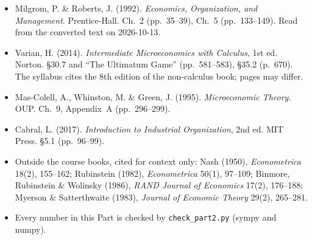 \begin{itemize}
  \item Milgrom, P. \& Roberts, J. (1992). \emph{Economics, Organization, and Management}.
  Prentice-Hall. Ch.~2 (pp.~35--39), Ch.~5 (pp.~133--149). Read from the converted text on
  2026-10-13.
  \item Varian, H. (2014). \emph{Intermediate Microeconomics with Calculus}, 1st ed. Norton.
  \S30.7 and ``The Ultimatum Game'' (pp.~581--583), \S35.2 (p.~670). The syllabus cites the
  8th edition of the non-calculus book; pages may differ.
  \item Mas-Colell, A., Whinston, M. \& Green, J. (1995). \emph{Microeconomic Theory}. OUP.
  Ch.~9, Appendix~A (pp.~296--299).
  \item Cabral, L. (2017). \emph{Introduction to Industrial Organization}, 2nd ed. MIT Press.
  \S5.1 (pp.~96--99).
  \item Outside the course books, cited for context only: Nash (1950), \emph{Econometrica}
  18(2), 155--162; Rubinstein (1982), \emph{Econometrica} 50(1), 97--109; Binmore, Rubinstein \&
  Wolinsky (1986), \emph{RAND Journal of Economics} 17(2), 176--188; Myerson \& Satterthwaite
  (1983), \emph{Journal of Economic Theory} 29(2), 265--281.
  \item Every number in this Part is checked by \texttt{check\_part2.py} (sympy and numpy).
\end{itemize}
